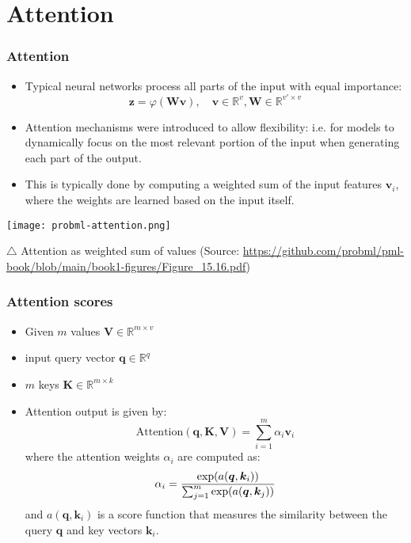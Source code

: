 \documentclass[smaller]{beamer}
\begin{document}
 \section{Attention}
 \begin{frame}
  \frametitle{Attention}\pe
  \begin{itemize}
    \item Typical neural networks process all parts of the input with equal importance: \pe
    \begin{equation}
      \bm z = \varphi (\bm W\bm v), \quad \bm v \in \mathbb{R}^v, \bm W\in\mathbb{R}^{v'\times v}  
    \end{equation}
    \pe
    \item Attention mechanisms were introduced to allow flexibility: i.e. for models to dynamically focus 
      on the most relevant portion of the input when generating each part of the output.\pe
    \item This is typically done by computing a weighted sum of the input features $\bm v_i$, where the weights are learned based on the input itself.

  \end{itemize}
\pe
\begin{center}
    \texttt{[image: probml-attention.png]}

    {\footnotesize $\triangle$ Attention as weighted sum of values (Source: \url{https://github.com/probml/pml-book/blob/main/book1-figures/Figure_15.16.pdf})}
\end{center}
 \end{frame}

\begin{frame}
  \frametitle{Attention scores}\pe

      \begin{itemize}
      \item Given $m$ values $\bm V \in \mathbb{R}^{m \times v}$\pe
      \item input query vector $\bm q \in \mathbb{R}^q$\pe
      \item $m$ keys $\bm K \in \mathbb{R}^{m \times k}$\pe
      \item Attention output is given by:\pe
      \begin{equation}
        \text{Attention}(\bm q, \bm K, \bm V) = \sum_{i=1}^{m} \alpha_i \bm v_i
      \end{equation}
      \pe
      where the attention weights $\alpha_i$ are computed as:\pe
      \begin{equation}
        \alpha_i = \frac{\exp( a(\bm q, \bm k_i))}{\sum_{j=1}^{m}\exp( a(\bm q, \bm k_j))} 
      \end{equation}
      \pe
      and $ a(\bm q, \bm k_i)$ is a score function that measures the similarity between the
      query $\bm q$ and key vectors $\bm k_i$.\pe
    \end{itemize}
\end{frame}
\end{document}
